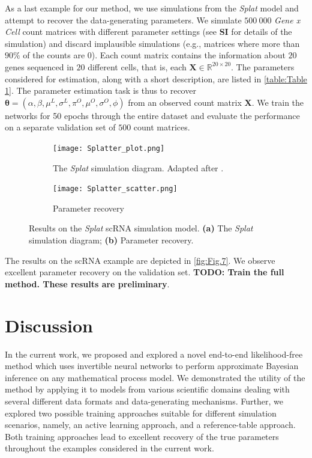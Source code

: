 \documentclass[9pt,twoside,lineno]{pnas-new}
\begin{document}
As a last example for our method, we use simulations from the \textit{Splat} model and attempt to recover the data-generating parameters. We simulate $500\ 000$  \textit{Gene x Cell} count matrices with different parameter settings (see \textbf{SI} for details of the simulation) and discard implausible simulations (e.g., matrices where more than $90\%$ of the counts are $0$). Each count matrix contains the information about $20$ genes sequenced in $20$ different cells, that is, each $\boldsymbol{X} \in \mathbb{R}^{20\times20}$. The parameters considered for estimation, along with a short description, are listed in \autoref{table:Table 1}. The parameter estimation task is thus to recover $\boldsymbol{\theta} = (\alpha,\beta,\mu^{L},\sigma^{L},\pi^{O},\mu^{O},\sigma^{O},\phi)$ from an observed count matrix $\boldsymbol{X}$. We train the networks for 50 epochs through the entire dataset and evaluate the performance on a separate validation set of $500$ count matrices.
\begin{figure}[H]
\centering
\begin{subfigure}{.49\textwidth}
    \centering
    \texttt{[image: Splatter\_plot.png]}
    \caption{The \textit{Splat} simulation diagram. Adapted after \cite{zappia2017splatter}.}
    \label{fig:Fig.7a}
\end{subfigure}
\begin{subfigure}{.49\textwidth}
    \centering
    \texttt{[image: Splatter\_scatter.png]}
    \caption{Parameter recovery }
    \label{fig:Fig.7b}
\end{subfigure}
\caption[short]{Results on the \textit{Splat} scRNA simulation model. \textbf{(a)} The \textit{Splat} simulation diagram; \textbf{(b)} Parameter recovery.} \label{fig:Fig.7}
\end{figure}
The results on the scRNA example are depicted in \autoref{fig:Fig.7}. We observe excellent parameter recovery on the validation set. \textbf{TODO: Train the full method. These results are preliminary}.

\section*{Discussion}

In the current work, we proposed and explored a novel end-to-end likelihood-free method which uses invertible neural networks to perform approximate Bayesian inference on any mathematical process model. We demonstrated the utility of the method by applying it to models from various scientific domains dealing with several different data formats and data-generating mechanisms. Further, we explored two possible training approaches suitable for different simulation scenarios, namely, an active learning approach, and a reference-table approach. Both training approaches lead to excellent recovery of the true parameters throughout the examples considered in the current work.
\end{document}
